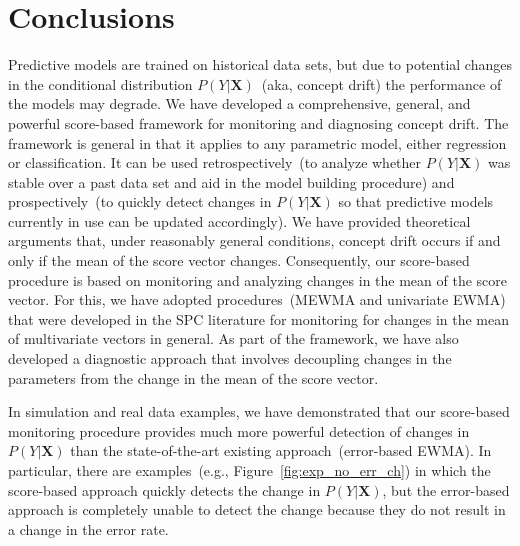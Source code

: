 \documentclass[twoside,11pt]{article}
\begin{document}
\section{Conclusions}
Predictive models are trained on historical data sets, but due to potential changes in the conditional distribution $P (Y|\bm {X})$~(aka, concept drift) the performance of the models may degrade. We have developed a comprehensive, general, and powerful score-based framework for monitoring and diagnosing concept drift. The framework is general in that it applies to any parametric model, either regression or classification. It can be used retrospectively~(to analyze whether $P (Y|\bm {X})$ was stable over a past data set and aid in the model building procedure) and prospectively~(to quickly detect changes in $P (Y|\bm {X})$ so that predictive models currently in use can be updated accordingly). We have provided theoretical arguments that, under reasonably general conditions, concept drift occurs if and only if the mean of the score vector changes. Consequently, our score-based procedure is based on monitoring and analyzing changes in the mean of the score vector. For this, we have adopted procedures~(MEWMA and univariate EWMA) that were developed in the SPC literature for monitoring for changes in the mean of multivariate vectors in general. As part of the framework, we have also developed a diagnostic approach that involves decoupling changes in the parameters from the change in the mean of the score vector. 

In simulation and real data examples, we have demonstrated that our score-based monitoring procedure provides much more powerful detection of changes in $P (Y|\bm {X})$ than the state-of-the-art existing approach~(error-based EWMA). In particular, there are examples~(e.g., Figure~\ref{fig:exp_no_err_ch}) in which the score-based approach quickly detects the change in $P (Y|\bm {X})$, but the error-based approach is completely unable to detect the change because they do not result in a change in the error rate. 



\end{document}
